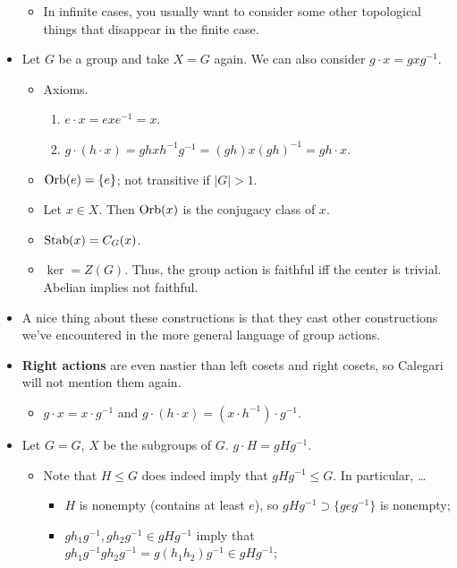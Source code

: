 \documentclass[../notes.tex]{subfiles}
\begin{document}
\begin{itemize}
    \begin{itemize}
        \item In infinite cases, you usually want to consider some other topological things that disappear in the finite case.
    \end{itemize}
    \item Let $G$ be a group and take $X=G$ again. We can also consider $g\cdot x=gxg^{-1}$.
    \begin{itemize}
        \item Axioms.
        \begin{enumerate}
            \item $e\cdot x=exe^{-1}=x$.
            \item $g\cdot(h\cdot x)=ghxh^{-1}g^{-1}=(gh)x(gh)^{-1}=gh\cdot x$.
        \end{enumerate}
        \item $\operatorname{Orb}(e)=\{e\}$; not transitive if $|G|>1$.
        \item Let $x\in X$. Then $\operatorname{Orb}(x)$ is the conjugacy class of $x$.
        \item $\operatorname{Stab}(x)=C_G(x)$.
        \item $\ker=Z(G)$. Thus, the group action is faithful iff the center is trivial. Abelian implies not faithful.
    \end{itemize}
    \item A nice thing about these constructions is that they cast other constructions we've encountered in the more general language of group actions.
    \item \textbf{Right actions} are even nastier than left cosets and right cosets, so Calegari will not mention them again.
    \begin{itemize}
        \item $g\cdot x=x\cdot g^{-1}$ and $g\cdot(h\cdot x)=(x\cdot h^{-1})\cdot g^{-1}$.
    \end{itemize}
    \item Let $G=G$, $X$ be the subgroups of $G$. $g\cdot H=gHg^{-1}$.
    \begin{itemize}
        \item Note that $H\leq G$ does indeed imply that $gHg^{-1}\leq G$. In particular, \dots
        \begin{itemize}
            \item $H$ is nonempty (contains at least $e$), so $gHg^{-1}\supset\{geg^{-1}\}$ is nonempty;
            \item $gh_1g^{-1},gh_2g^{-1}\in gHg^{-1}$ imply that $gh_1g^{-1}gh_2g^{-1}=g(h_1h_2)g^{-1}\in gHg^{-1}$;

\end{itemize}
\end{itemize}
\end{itemize}
\end{document}

